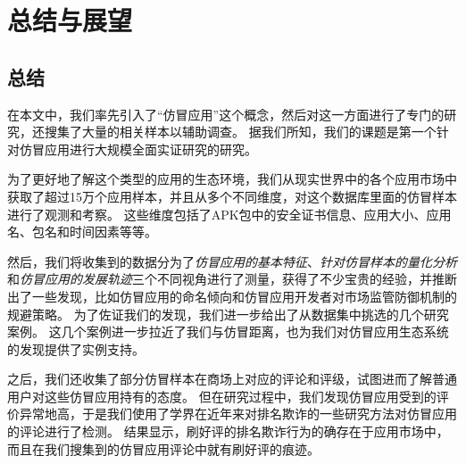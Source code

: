 \chapter{总结与展望}
\label{chp:future}

\section{总结}
在本文中，我们率先引入了``仿冒应用''这个概念，然后对这一方面进行了专门的研究，还搜集了大量的相关样本以辅助调查。
据我们所知，我们的课题是第一个针对仿冒应用进行大规模全面实证研究的研究。

为了更好地了解这个类型的应用的生态环境，我们从现实世界中的各个应用市场中获取了超过15万个应用样本，并且从多个不同维度，对这个数据库里面的仿冒样本进行了观测和考察。
这些维度包括了APK包中的安全证书信息、应用大小、应用名、包名和时间因素等等。

然后，我们将收集到的数据分为了\emph{仿冒应用的基本特征}、\emph{针对仿冒样本的量化分析}和\emph{仿冒应用的发展轨迹}三个不同视角进行了测量，获得了不少宝贵的经验，并推断出了一些发现，比如仿冒应用的命名倾向和仿冒应用开发者对市场监管防御机制的规避策略。
为了佐证我们的发现，我们进一步给出了从数据集中挑选的几个研究案例。
这几个案例进一步拉近了我们与仿冒距离，也为我们对仿冒应用生态系统的发现提供了实例支持。

之后，我们还收集了部分仿冒样本在商场上对应的评论和评级，试图进而了解普通用户对这些仿冒应用持有的态度。
但在研究过程中，我们发现仿冒应用受到的评价异常地高，于是我们使用了学界在近年来对排名欺诈的一些研究方法对仿冒应用的评论进行了检测。
结果显示，刷好评的排名欺诈行为的确存在于应用市场中，而且在我们搜集到的仿冒应用评论中就有刷好评的痕迹。


